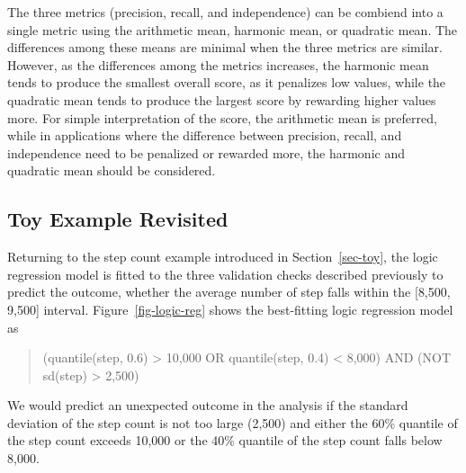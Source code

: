\documentclass[
  12pt,
]{interact}
\begin{document}
The three metrics (precision, recall, and independence) can be combiend
into a single metric using the arithmetic mean, harmonic mean, or
quadratic mean. The differences among these means are minimal when the
three metrics are similar. However, as the differences among the metrics
increases, the harmonic mean tends to produce the smallest overall
score, as it penalizes low values, while the quadratic mean tends to
produce the largest score by rewarding higher values more. For simple
interpretation of the score, the arithmetic mean is preferred, while in
applications where the difference between precision, recall, and
independence need to be penalized or rewarded more, the harmonic and
quadratic mean should be considered.

\subsection{Toy Example Revisited}\label{toy-example-revisited}

Returning to the step count example introduced in Section~\ref{sec-toy},
the logic regression model is fitted to the three validation checks
described previously to predict the outcome, whether the average number
of step falls within the {[}8,500, 9,500{]} interval.
Figure~\ref{fig-logic-reg} shows the best-fitting logic regression model
as

\begin{quote}
(quantile(step, 0.6) \textgreater{} 10,000 OR quantile(step, 0.4)
\textless{} 8,000) AND (NOT sd(step) \textgreater{} 2,500)
\end{quote}

We would predict an unexpected outcome in the analysis if the standard
deviation of the step count is not too large (2,500) and either the 60\%
quantile of the step count exceeds 10,000 or the 40\% quantile of the
step count falls below 8,000.
\end{document}
